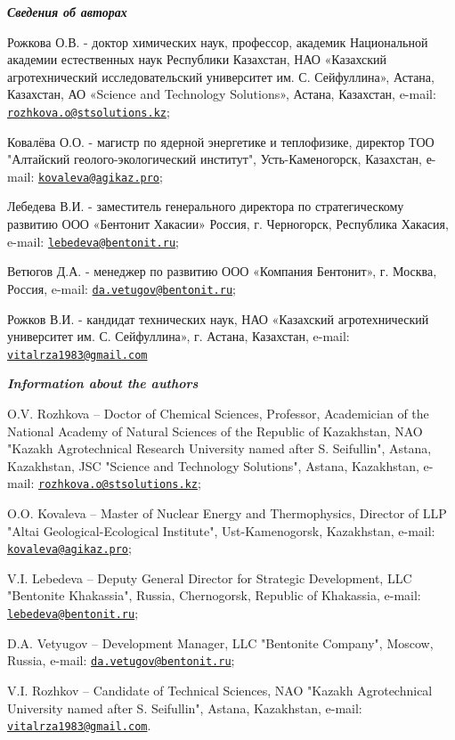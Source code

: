 \emph{{\bfseries Сведения об авторах}}

Рожкова О.В. - доктор химических наук, профессор, академик Национальной
академии естественных наук Республики Казахстан, НАО «Казахский
агротехнический исследовательский университет им. С. Сейфуллина»,
Астана, Казахстан, АО «Science and Technology Solutions», Астана,
Казахстан, e-mail:
\href{mailto:rozhkova.o@stsolutions.kz}{\nolinkurl{rozhkova.o@stsolutions.kz}};

Ковалёва О.О. - магистр по ядерной энергетике и теплофизике, директор
ТОО "Алтайский геолого-экологический институт", Усть-Каменогорск,
Казахстан, е-mail:
\href{mailto:kovaleva@agikaz.pro}{\nolinkurl{kovaleva@agikaz.pro}};

Лебедева В.И. - заместитель генерального директора по стратегическому
развитию ООО «Бентонит Хакасии» Россия, г. Черногорск, Республика
Хакасия, e-mail:
\href{mailto:lebedeva@bentonit.ru}{\nolinkurl{lebedeva@bentonit.ru}};

Ветюгов Д.А. - менеджер по развитию ООО «Компания Бентонит», г. Москва,
Россия, e-mail:
\href{mailto:da.vetugov@bentonit.ru}{\nolinkurl{da.vetugov@bentonit.ru}};

Рожков В.И. - кандидат технических наук, НАО «Казахский агротехнический
университет им. С. Сейфуллина», г. Астана, Казахстан, e-mail:
\href{mailto:vitalrza1983@gmail.com}{\nolinkurl{vitalrza1983@gmail.com}}

\emph{{\bfseries Information about the authors}}

O.V. Rozhkova -- Doctor of Chemical Sciences, Professor, Academician of
the National Academy of Natural Sciences of the Republic of Kazakhstan,
NAO "Kazakh Agrotechnical Research University named after S. Seifullin",
Astana, Kazakhstan, JSC "Science and Technology Solutions", Astana,
Kazakhstan, e-mail:
\href{mailto:rozhkova.o@stsolutions.kz}{\nolinkurl{rozhkova.o@stsolutions.kz}};

O.O. Kovaleva -- Master of Nuclear Energy and Thermophysics, Director of
LLP "Altai Geological-Ecological Institute", Ust-Kamenogorsk,
Kazakhstan, e-mail:
\href{mailto:kovaleva@agikaz.pro}{\nolinkurl{kovaleva@agikaz.pro}};

V.I. Lebedeva -- Deputy General Director for Strategic Development, LLC
"Bentonite Khakassia", Russia, Chernogorsk, Republic of Khakassia,
e-mail:
\href{mailto:lebedeva@bentonit.ru}{\nolinkurl{lebedeva@bentonit.ru}};

D.A. Vetyugov -- Development Manager, LLC "Bentonite Company", Moscow,
Russia, e-mail:
\href{mailto:da.vetugov@bentonit.ru}{\nolinkurl{da.vetugov@bentonit.ru}};

V.I. Rozhkov -- Candidate of Technical Sciences, NAO "Kazakh
Agrotechnical University named after S. Seifullin", Astana, Kazakhstan,
e-mail:
\href{mailto:vitalrza1983@gmail.com}{\nolinkurl{vitalrza1983@gmail.com}}.\